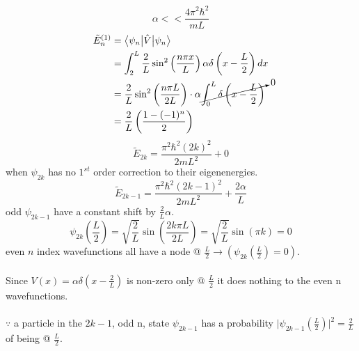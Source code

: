 \documentclass[12pt]{article}
\begin{document}
\begin{equation*}
	\alpha << \frac{4 \pi^2 \hbar^2}{mL}
\end{equation*}
\begin{align*}
	\tilde{E}^{(1)}_n & = \big<\psi_n \big| \hat{V}\big|\psi_{n}\big>\\
	& = \int_{2}^{L} \frac{2}{L} \sin^2 \left(\frac{n\pi x}{L}\right)\alpha\delta\left(x - \frac{L}{2}
	\right)dx\\
	& = \frac{2}{L}\sin^2 \left(\frac{n\pi L}{2L}\right)\cdot \alpha \cancelto{0}{\int_{0}^{L}
	\delta\left(x - \frac{L}{2}\right)}\\
	& = \frac{2}{L}\left(\frac{1-(-1)^n}{2}\right)
\end{align*}
\begin{equation*}
	\tilde{E}_{2k} = \frac{\pi^2 \hbar^2 (2k)^2}{2mL^2} + 0
\end{equation*}
when $\psi_{2k}$ has no $1^{st}$ order correction to their eigenenergies.
\begin{equation*}
	\tilde{E}_{2k-1} = \frac{\pi^2 \hbar^2 (2k-1)^2}{2mL^2} + \frac{2\alpha}{L}
\end{equation*}
odd $\psi_{2k-1}$ have a constant shift by $\frac{2}{L}\alpha$.
\begin{equation*}
	\psi_{2k}\left(\frac{L}{2}\right) = \sqrt{\frac{2}{L}} \sin\left(\frac{2k\pi L}{2L}\right) = 
	\sqrt{\frac{2}{L}}\sin(\pi k)= 0
\end{equation*}
even $n$ index wavefunctions all have a node @ $\frac{L}{2}\rightarrow \left(
\psi_{2k}\left(\frac{L}{2}\right)=0\right)$.\\
\\
Since $V(x) = \alpha \delta\left(x - \frac{2}{L}\right)$ is non-zero only @ $\frac{L}{2}$ it does nothing to the even
n wavefunctions.\\
\\
$\because$ a particle in the $2k-1$, odd n, state $\psi_{2k-1}$ has a probability $\Big|\psi_{2k-1}
\left(\frac{L}{2}\right)\Big|^2 = \frac{2}{L}$ of being @ $\frac{L}{2}$.
\newpage
\end{document}
